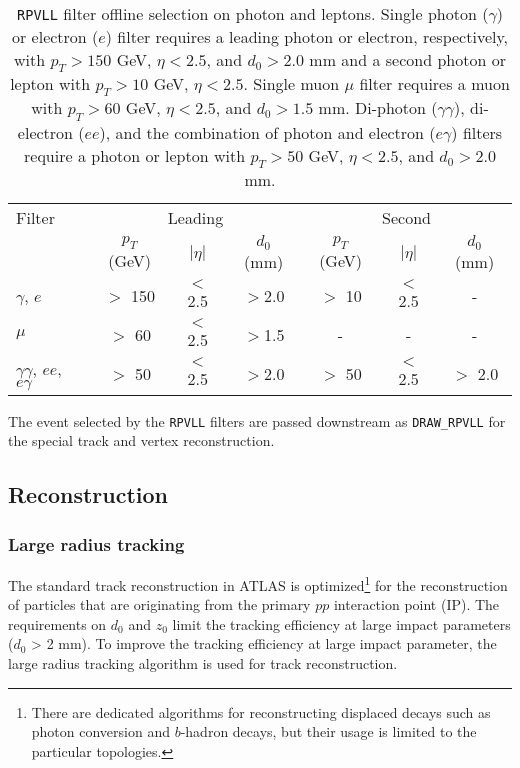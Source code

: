 \begin{table}[!htb]
  \centering
  \begin{tabular}{l c c c | c c c}
    \hline
    \hline
    Filter          & \multicolumn{3}{c|}{Leading}  &  \multicolumn{3}{c}{Second} \\
                    & $p_{T}$ (GeV) & $|\eta|$    & $d_{0}$ (mm) & $p_{T}$ (GeV) & $|\eta|$    & $d_{0}$ (mm)  \\
    \hline
    $\gamma$, $e$                   & $>$ 150   & $<$2.5  & $>$2.0  & $>$ 10 & $<$2.5 & -       \\
    $\mu$                           & $>$ 60    & $<$2.5  & $>$1.5  & -      & -      & -       \\
    $\gamma\gamma$, $ee$, $e\gamma$ & $>$ 50    & $<$2.5  & $>$2.0  & $>$ 50 & $<$2.5 & $>$ 2.0 \\
    \hline
    \hline
  \end{tabular}
  \caption{\texttt{RPVLL} filter offline selection on photon and leptons. Single photon ($\gamma$) or electron ($e$) filter requires a leading photon or electron, respectively, with $p_{T} > 150$ GeV, $\eta < 2.5$, and $d_{0} > 2.0$ mm and a second photon or lepton with $p_{T} > 10$ GeV, $\eta < 2.5$. Single muon $\mu$ filter requires a muon with $p_{T} > 60$ GeV, $\eta < 2.5$, and $d_{0} > 1.5$ mm. Di-photon ($\gamma\gamma$), di-electron ($ee$), and the combination of photon and electron ($e\gamma$) filters require a photon or lepton with $p_{T} > 50$ GeV, $\eta < 2.5$, and $d_{0} > 2.0$ mm.}
  \label{table:rpvll_filter_selection}
\end{table}

The event selected by the \texttt{RPVLL} filters are passed downstream as \texttt{DRAW\_RPVLL} for the special track and vertex reconstruction.


\subsection{Reconstruction}
\label{sec:track_vertex_reconstruction}

\subsubsection{Large radius tracking}
\label{sec:large_radius_tracking}

The standard track reconstruction in ATLAS is optimized\footnote{There are dedicated algorithms for reconstructing displaced decays such as photon conversion and $b$-hadron decays, but their usage is limited to the particular topologies.} for the reconstruction of particles that are originating from the primary $pp$ interaction point (IP). The requirements on $d_{0}$ and $z_{0}$ limit the tracking efficiency at large impact parameters ($d_{0}$ > 2 mm). To improve the tracking efficiency at large impact parameter, the large radius tracking algorithm is used for track reconstruction.

